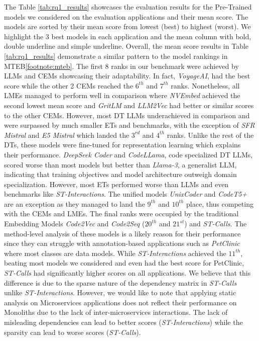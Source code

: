 The Table \ref{tab:rq1_results} showcases the evaluation results for the Pre-Trained models we considered on the evaluation applications and their mean score. The models are sorted by their mean score from lowest (best) to highest (worst). We highlight the 3 best models in each application and the mean column with bold, double underline and simple underline. Overall, the mean score results in Table \ref{tab:rq1_results} demonstrate a similar pattern to the model rankings in MTEB\cref{footnote:mteb}. The first 8 ranks in our benchmark were achieved by LLMs and CEMs showcasing their adaptability. In fact, \textit{VoyageAI}, had the best score while the other 2 CEMs reached the $6^{th}$ and $7^{th}$ ranks. Nonetheless, all LMEs managed to perform well in comparison where \textit{NVEmbed} achieved the second lowest mean score and \textit{GritLM} and \textit{LLM2Vec} had better or similar scores to the other CEMs. However, most DT LLMs underachieved in comparison and were surpassed by much smaller ETs and benchmarks, with the exception of \textit{SFR Mistral} and \textit{E5 Mistral} which landed the $3^{rd}$ and $4^{th}$ ranks. Unlike the rest of the DTs, these models were fine-tuned for representation learning which explains their performance. \textit{DeepSeek Coder} and \textit{CodeLLama}, code specialized DT LLMs, scored worse than most models but better than \textit{Llama-3}, a generalist LLM, indicating that training objectives and model architecture outweigh domain specialization. However, most ETs performed worse than LLMs and even benchmarks like \textit{ST-Interactions}. The unified models \textit{UnixCoder} and \textit{CodeT5+} are an exception as they managed to land the $9^{th}$ and $10^{th}$ place, thus competing with the CEMs and LMEs. The final ranks were occupied by the traditional Embedding Models \textit{Code2Vec} and \textit{Code2Seq} ($20^{th}$ and $21^{st}$) and \textit{ST-Calls}. The method-level analysis of these models is a likely reason for their performance since they can struggle with annotation-based applications such as \textit{PetClinic} where most classes are data models. While \textit{ST-Interactions} achieved the $11^{th}$, beating most models we considered and even had the best score for PetClinic, \textit{ST-Calls} had significantly higher scores on all applications. We believe that this difference is due to the sparse nature of the dependency matrix in \textit{ST-Calls} unlike \textit{ST-Interactions}. However, we would like to note that applying static analysis on Microservices applications does not reflect their performance on Monoliths due to the lack of inter-microservices interactions. The lack of misleading dependencies can lead to better scores (\textit{ST-Interactions}) while the sparsity can lead to worse scores (\textit{ST-Calls}).

